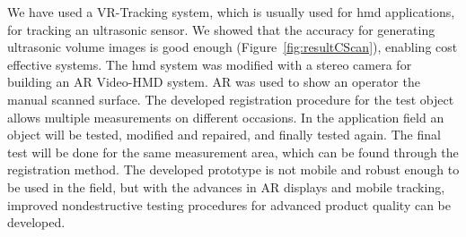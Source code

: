 \documentclass{VRARWorkshop}
\begin{document}
We have used a VR-Tracking system, which is usually used for {\sc hmd} applications, for tracking an ultrasonic sensor.
We showed that the accuracy for generating ultrasonic volume images is good enough (Figure~\ref{fig:resultCScan}), enabling cost effective systems.
The {\sc hmd} system was modified with a stereo camera for building an AR {\sc Video-HMD} system.
AR was used to show an operator the manual scanned surface.
The developed registration procedure for the test object allows multiple measurements on different occasions.
In the application field an object will be tested, modified and repaired, and finally tested again.
The final test will be done for the same measurement area, which can be found through the registration method.
The developed prototype is not mobile and robust enough to be used in the field, but with the advances in AR displays and mobile tracking, improved nondestructive testing procedures for advanced product quality can be developed.

\VRARsetbibstyle

\end{document}
